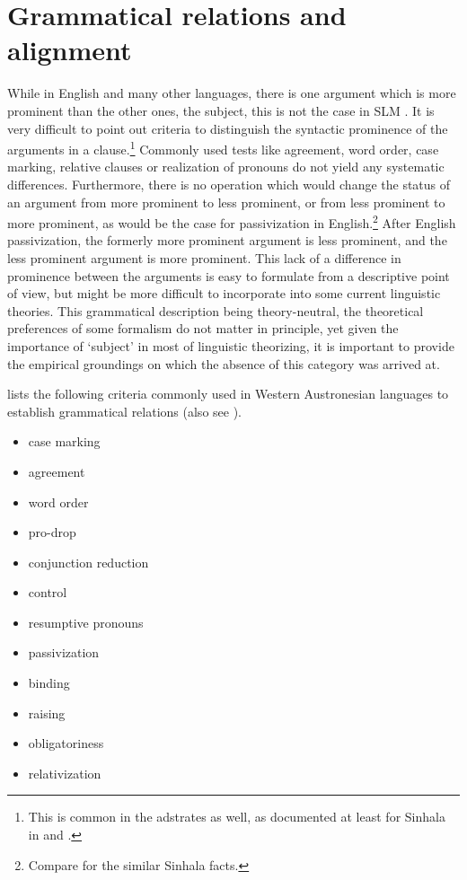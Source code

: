 
\chapter{Grammatical relations and alignment}\label{sec:gramrel}
While in English and many other languages, there is one argument which is more prominent than the other ones, the subject, this is not the case in SLM \citep[cf.][16]{Ansaldo2005ms}. It is very difficult to point out criteria to distinguish the syntactic prominence of the arguments in a clause.\footnote{This is common in the adstrates as well, as documented at least for Sinhala in \citet{Gair1976sinhalasubject,Gair1991infl} and \citet{Henadeerage2002}.} Commonly used tests like agreement, word order, case marking, relative clauses or realization of pronouns do not yield any systematic differences. Furthermore, there is no operation  which would change the status of an argument from more prominent to less prominent, or from less prominent to more prominent, as would be the case for passivization in English.\footnote{Compare \citet[19]{Gair1991infl}for the similar Sinhala facts.} After English passivization, the formerly more prominent argument is less prominent, and the less prominent argument is more prominent.
This lack of a difference in prominence between the arguments is easy to formulate from a descriptive point of view, but might be more difficult to incorporate into some current linguistic theories. This grammatical description being theory-neutral, the theoretical preferences of some formalism do not matter in principle, yet given the importance of `subject' in most of linguistic theorizing, it is important to provide the empirical groundings on which the absence of this category was arrived at.

\citet[152]{Himmelmann2005typochar} lists the following criteria commonly used in Western Austronesian languages to establish grammatical relations (also see \citep{Keenan1976,Schachter1996none}).

\begin{itemize}
 \item case marking 
 \item agreement 
 \item word order 
 \item pro-drop 
 \item conjunction reduction 
 \item control 
 \item resumptive pronouns 
 \item passivization 
 \item binding 
 \item raising 
 \item obligatoriness 
 \item relativization 
\end{itemize}

